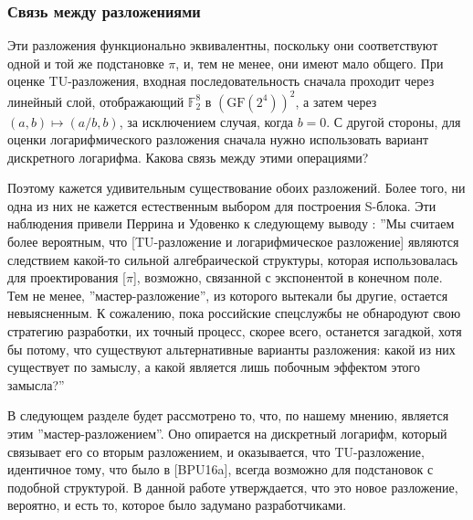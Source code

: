 \subsubsection{Связь между разложениями}

Эти разложения функционально эквивалентны, поскольку они соответствуют одной и той же подстановке \(\pi\), и, тем не менее, они имеют мало общего. При оценке TU-разложения, входная последовательность сначала проходит через линейный слой, отображающий \(\mathbb{F}_2^8\) в \((\text{GF}(2^4))^2\), а затем через \((a, b) \mapsto (a/b, b)\), за исключением случая, когда \(b = 0\). С другой стороны, для оценки логарифмического разложения сначала нужно использовать вариант дискретного логарифма. Какова связь между этими операциями?

Поэтому кажется удивительным существование обоих разложений. Более того, ни одна из них не кажется естественным выбором для построения S-блока. Эти наблюдения привели Перрина и Удовенко к следующему выводу \cite{PU16}: ''Мы считаем более вероятным, что [TU-разложение и логарифмическое разложение] являются следствием какой-то сильной алгебраической структуры, которая использовалась для проектирования [\(\pi\)], возможно, связанной с экспонентой в конечном поле. Тем не менее, ''мастер-разложение'', из которого вытекали бы другие, остается невыясненным. К сожалению, пока российские спецслужбы не обнародуют свою стратегию разработки, их точный процесс, скорее всего, останется загадкой, хотя бы потому, что существуют альтернативные варианты разложения: какой из них существует по замыслу, а какой является лишь побочным эффектом этого замысла?''

В следующем разделе будет рассмотрено то, что, по нашему мнению, является этим ''мастер-разложением''. Оно опирается на дискретный логарифм, который связывает его со вторым разложением, и оказывается, что TU-разложение, идентичное тому, что было в [BPU16a], всегда возможно для подстановок с подобной структурой. В данной работе утверждается, что это новое разложение, вероятно, и есть то, которое было задумано разработчиками.